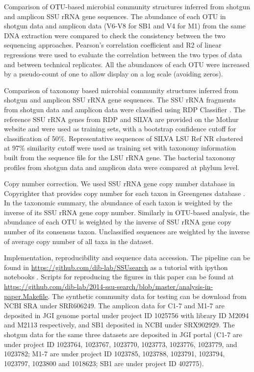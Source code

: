 \documentclass[]{msu-thesis}
\begin{document}
Comparison of OTU-based microbial community structures inferred from shotgun and amplicon SSU rRNA gene sequences. The abundance of each OTU in shotgun data and amplicon data (V6-V8 for SB1 and V4 for M1) from the same DNA extraction were compared to check the consistency between the two sequencing approaches. Pearson’s correlation coefficient and R2 of linear regressions were used to evaluate the correlation between the two types of data and between technical replicates. All the abundances of each OTU were increased by a pseudo-count of one to allow display on a log scale (avoiding zeros). 

Comparison of taxonomy based microbial community structures inferred from shotgun and amplicon SSU rRNA gene sequences. The SSU rRNA fragments from shotgun data and amplicon data were classified using RDP Classifier \cite{wang_naive_2007}. The reference SSU rRNA genes from RDP and SILVA are provided on the Mothur website and were used as training sets, with a bootstrap confidence cutoff for classification of 50\%. Representative sequences of SILVA LSU Ref NR clustered at 97\% similarity cutoff were used as training set with taxonomy information built from the sequence file for the LSU rRNA gene. The bacterial taxonomy profiles from shotgun data and amplicon data were compared at phylum level.

Copy number correction. We used SSU rRNA gene copy number database in Copyrighter \cite{angly_copyrighter:_2014} that provides copy number for each taxon in Greengenes database \cite{desantis_greengenes_2006}. In the taxonomic summary, the abundance of each taxon is weighted by the inverse of its SSU rRNA gene copy number. Similarly in OTU-based analysis, the abundance of each OTU is weighted by the inverse of SSU rRNA gene copy number of its consensus taxon. Unclassified sequences are weighted by the inverse of average copy number of all taxa in the dataset.

Implementation, reproducibility and sequence data accession. The pipeline can be found in \url{https://github.com/dib-lab/SSUsearch} as a tutorial with ipython notebooks \cite{perez_ipython:_2007}. Scripts for reproducing the figures in this paper can be found at \url{https://github.com/dib-lab/2014-ssu-search/blob/master/analysis-in-paper.Makefile}. The synthetic community data for testing can be download from NCBI SRA under SRR606249. The amplicon data for C1-7 and M1-7 are deposited in JGI genome portal under project ID 1025756 with library ID M2094 and M2113 respectively, and SB1 deposited in NCBI under SRX902929. The shotgun data for the same three datasets are deposited in JGI portal (C1-7 are under project ID 1023764, 1023767, 1023770, 1023773, 1023776, 1023779, and 1023782; M1-7 are under project ID 1023785, 1023788, 1023791, 1023794, 1023797, 1023800 and 1018623; SB1 are under project ID 402775).
\end{document}
